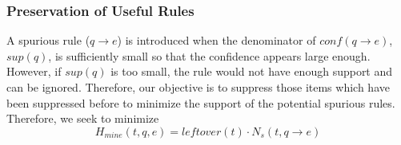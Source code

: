 %

\subsubsection{Preservation of Useful Rules}

A spurious rule ($q \rightarrow e$) is introduced when
the denominator of $conf(q \rightarrow e)$, $sup(q)$,
is sufficiently small so that the confidence appears large enough.
However, if $sup(q)$ is too small, the rule would not have enough
support and can be ignored.
Therefore, our objective is to suppress those items
which have been suppressed before to minimize the support of the
potential spurious rules.
%
Therefore, we seek to minimize
\[H_{mine}(t, q, e)=leftover(t)\cdot N_s(t, q\rightarrow e)\]
%

